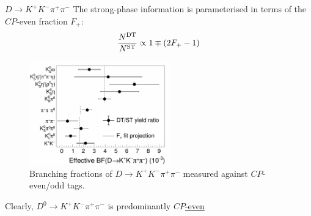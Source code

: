 \documentclass{beamer}
\begin{document}
\begin{frame}{$D\to K^+K^-\pi^+\pi^-$}
  \vspace{0.0cm}
  {\large The strong-phase information is parameterised in terms of the $C\!P$-even fraction $F_+$:}
  \vspace{-0.5cm}
  \begin{equation*}
    \frac{N^{\rm DT}}{N^{\rm ST}}\propto 1 \mp (2F_+ - 1)
  \end{equation*}
  \vspace{-0.5cm}
  \begin{figure}
    \centering
    \includegraphics[width=0.55\textwidth]{Figures/CPeven_fraction_combination_CPtags.png}
    \caption*{Branching fractions of $D\to K^+K^-\pi^+\pi^-$ measured against $C\!P$-even/odd tags.}
  \end{figure}
  \vspace{-0.4cm}
  \begin{center}
    {\large Clearly, $D^0\to K^+K^-\pi^+\pi^-$ is predominantly \underline{$C\!P$-even}}
  \end{center}
\end{frame}
\end{document}

